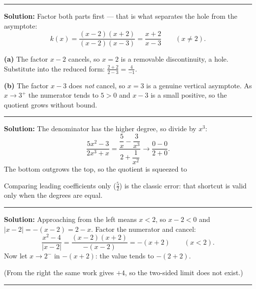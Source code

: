 \documentclass[12pt]{article}
\begin{document}
\vspace{0.2cm}\noindent\rule{\linewidth}{0.2pt}\vspace{0.2cm}


\textbf{Solution:} Factor both parts first --- that is what separates the hole
from the asymptote:
\[
  k(x) = \frac{(x-2)(x+2)}{(x-2)(x-3)} = \frac{x+2}{x-3} \qquad (x \neq 2).
\]

\textbf{(a)} The factor $x-2$ cancels, so $x = 2$ is a removable discontinuity, a
hole. Substitute into the reduced form: $\frac{2+2}{2-3} = \frac{4}{-1}$. 

\textbf{(b)} The factor $x - 3$ does \emph{not} cancel, so $x = 3$ is a genuine
vertical asymptote. As $x \to 3^+$ the numerator tends to $5 > 0$ and $x - 3$ is a
small positive, so the quotient grows without bound. \ans{+\infty}

\vspace{0.2cm}\noindent\rule{\linewidth}{0.2pt}\vspace{0.2cm}


\textbf{Solution:} The denominator has the higher degree, so divide by $x^3$:
\[
  \frac{5x^2 - 3}{2x^3 + x} = \frac{\dfrac{5}{x} - \dfrac{3}{x^3}}{2 + \dfrac{1}{x^2}}
  \longrightarrow \frac{0 - 0}{2 + 0}.
\]
The bottom outgrows the top, so the quotient is squeezed to 

Comparing leading coefficients only ($\frac{5}{2}$) is the classic error: that
shortcut is valid only when the degrees are equal.

\vspace{0.2cm}\noindent\rule{\linewidth}{0.2pt}\vspace{0.2cm}


\textbf{Solution:} Approaching from the left means $x < 2$, so $x - 2 < 0$ and
$|x-2| = -(x-2) = 2 - x$. Factor the numerator and cancel:
\[
  \frac{x^2-4}{|x-2|} = \frac{(x-2)(x+2)}{-(x-2)} = -(x+2) \qquad (x < 2).
\]
Now let $x \to 2^-$ in $-(x+2)$: the value tends to $-(2+2)$. 

(From the right the same work gives $+4$, so the two-sided limit does not exist.)

\vspace{0.2cm}\noindent\rule{\linewidth}{0.2pt}\vspace{0.2cm}
\end{document}
